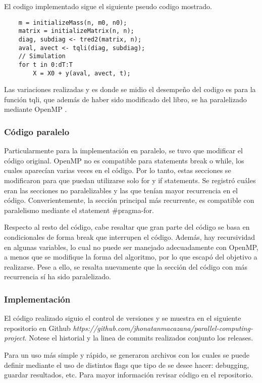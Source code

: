 El codigo implementado sigue el siguiente pseudo codigo mostrado. 
\begin{verbatim}
	m = initializeMass(n, m0, n0);
	matrix = initializeMatrix(n, n);
	diag, subdiag <- tred2(matrix, n);
	aval, avect <- tqli(diag, subdiag);
	// Simulation
	for t in 0:dT:T
		X = X0 + y(aval, avect, t);
\end{verbatim}

Las variaciones realizadas y es donde se midio el desempeño del codigo es para la función tqli, que además de haber sido modificado del libro, se ha paralelizado mediante OpenMP \cite{al2017parallel}.


\subsubsection{Código paralelo}
Particularmente para la implementación en paralelo, se tuvo que modificar el código original. OpenMP no es compatible para statements break o while, los cuales aparecían varias veces en el código. Por lo tanto, estas secciones se modificaron para que puedan utilizarse solo for y if statements. Se registró cuáles eran las secciones no paralelizables y las que tenían mayor recurrencia en el código. Converientemente, la sección principal más recurrente, es compatible con paralelismo mediante el statement \#pragma-for. 

Respecto al resto del código, cabe resaltar que gran parte del código se basa en condicionales de forma break que interrupen el código. Además, hay recursividad en algunas variables, lo cual no puede ser manejado adecuadamente con OpenMP, a menos que se modifique la forma del algoritmo, por lo que escapó del objetivo a realizarse. Pese a ello, se resalta nuevamente que la sección del código con más recurrencia sí ha sido paralelizado.

\subsubsection{Implementación}
El código realizado siguio el control de versiones  y se muestra en el siguiente repositorio en Github \textit{https://github.com/jhonatanmacazana/parallel-computing-project}. Notese el historial y la linea de commits realizados conjunto los releases.

Para un uso más simple y rápido, se generaron archivos  con los cuales se puede definir mediante el uso de distintos flags que tipo de se desee hacer: debugging, guardar resultados, etc. Para mayor información revisar código en el repositorio.

